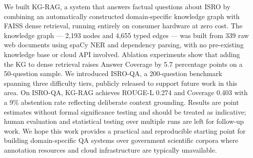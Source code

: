 \documentclass[conference]{IEEEtran}
\begin{document}
We built KG-RAG, a system that answers factual questions about ISRO by combining an automatically constructed domain-specific knowledge graph with FAISS dense retrieval, running entirely on consumer hardware at zero cost. The knowledge graph — 2,193 nodes and 4,655 typed edges — was built from 339 raw web documents using spaCy NER and dependency parsing, with no pre-existing knowledge base or cloud API involved. Ablation experiments show that adding the KG to dense retrieval raises Answer Coverage by 5.7 percentage points on a 50-question sample. We introduced ISRO-QA, a 200-question benchmark spanning three difficulty tiers, publicly released to support future work in this area. On ISRO-QA, KG-RAG achieves ROUGE-L 0.274 and Coverage 0.403 with a 9\% abstention rate reflecting deliberate context grounding. Results are point estimates without formal significance testing and should be treated as indicative; human evaluation and statistical testing over multiple runs are left for follow-up work. We hope this work provides a practical and reproducible starting point for building domain-specific QA systems over government scientific corpora where annotation resources and cloud infrastructure are typically unavailable.
\end{document}

